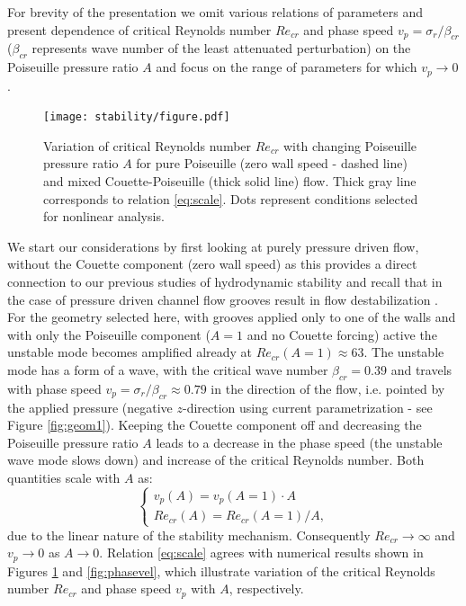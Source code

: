 \documentclass[lineno]{jfm}
\begin{document}
For brevity of the presentation we omit various relations of parameters and present dependence of critical Reynolds number $Re_{cr}$ and phase speed $v_{p}=\sigma_r / \beta_{cr}$ ($\beta_{cr}$ represents wave number of the least attenuated perturbation) on the  Poiseuille pressure ratio $A$ and focus on the range of parameters for which $v_p\to0$.

\begin{figure}
\centering
	\texttt{[image: stability/figure.pdf]}  
	\caption{Variation of critical Reynolds number $Re_{cr}$ with changing Poiseuille pressure ratio $A$ for pure Poiseuille (zero wall speed - dashed line) and mixed Couette-Poiseuille (thick solid line) flow. Thick gray line corresponds to relation \eqref{eq:scale}. Dots represent conditions selected for nonlinear analysis.}
	\label{fig:recrit}
\end{figure}

We start our considerations by first looking at purely pressure driven flow, without the Couette component (zero wall speed) as this provides a direct connection to our previous studies of hydrodynamic stability and recall that in the case of pressure driven channel flow grooves result in flow destabilization \citep{Nikesh2017}.
For the geometry selected here, with grooves applied only to one of the walls and with only the Poiseuille component ($A=1$ and no Couette forcing) active the unstable mode becomes amplified already at $Re_{cr}(A=1)\approx63$.
The unstable mode has a form of a wave, with the critical wave number $\beta_{cr}=0.39$ and travels with phase speed $v_{p}={\sigma_{r}}/{\beta_{cr}}\approx0.79$ in the direction of the flow, i.e. pointed by the applied pressure (negative $z$-direction using current parametrization - see Figure \ref{fig:geom1}).
Keeping the Couette component off and decreasing the Poiseuille pressure ratio $A$ leads to a decrease in the phase speed (the unstable wave mode slows down) and increase of the critical Reynolds number.
Both quantities scale with $A$ as:
\begin{equation}
    \begin{cases}
        v_{p}(A) = v_p(A=1)\cdot A \\
        Re_{cr}(A)=Re_{cr}(A=1)/A,
    \end{cases}
    \label{eq:scale}
\end{equation}
due to the linear nature of the stability mechanism.
Consequently $Re_{cr}\to\infty$ and $v_p\to0$ as $A\to0$.
Relation \eqref{eq:scale} agrees with numerical results shown in Figures \ref{fig:recrit} and \ref{fig:phasevel}, which illustrate variation of the critical Reynolds number $Re_{cr}$ and phase speed $v_p$ with $A$, respectively.
\end{document}
